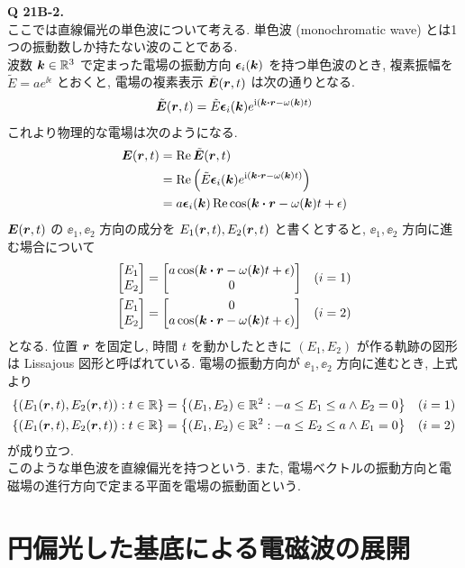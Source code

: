 \documentclass[uplatex,a4paper,dvipdfmx]{jsarticle}
\theoremstyle{definition}
\begin{document}
\textbf{Q 21B-2.} \\
ここでは直線偏光の単色波について考える. 単色波 (monochromatic wave) とは1つの振動数しか持たない波のことである. \\
波数 $\vb*{k}\in\mathbb{R}^3$ で定まった電場の振動方向 $\vb*{\epsilon}_i(\vb*{k})$ を持つ単色波のとき, 複素振幅を $\tilde{E} = ae^{\ii\epsilon}$ とおくと, 電場の複素表示 $\tilde{\vb*{E}}(\vb*{r}, t)$ は次の通りとなる.
\begin{align}
  \tilde{\EE}(\rr, t) = \tilde{E}\ee_i(\kk)e^{\ii(\kk\vdot\rr-\omega(\kk)t)}
\end{align}
これより物理的な電場は次のようになる.
\begin{align}
  \EE(\rr, t) & = \Re\tilde{\EE}(\rr, t)                                               \\
              & = \Re\left(\tilde{E}\ee_i(\kk)e^{\ii(\kk\vdot\rr-\omega(\kk)t)}\right) \\
              & = a\ee_i(\kk)\Re\cos(\kk\vdot\rr-\omega(\kk)t + \epsilon)
\end{align}
$\vb*{E}(\vb*{r}, t)$ の $\ee_1, \ee_2$ 方向の成分を $E_1(\vb*{r}, t), E_2(\vb*{r}, t)$ と書くとすると, $\ee_1, \ee_2$ 方向に進む場合について
\begin{align}
  \mqty[E_1 \\ E_2] &= \mqty[a\cos(\kk\vdot\rr - \omega(\kk)t + \epsilon) \\ 0] & (i = 1) \\
  \mqty[E_1 \\ E_2] &= \mqty[0 \\ a\cos(\kk\vdot\rr - \omega(\kk)t + \epsilon)] & (i = 2)
\end{align}
となる. 位置 $\vb*{r}$ を固定し, 時間 $t$ を動かしたときに $(E_1, E_2)$ が作る軌跡の図形は Lissajous 図形と呼ばれている. 電場の振動方向が $\ee_1, \ee_2$ 方向に進むとき, 上式より
\begin{align}
  \qty{\qty(E_1(\vb*{r}, t), E_2(\vb*{r}, t)):t\in\mathbb{R}} & = \qty{\qty(E_1,E_2)\in\mathbb{R}^2:-a\leq E_1\leq a\land E_2 = 0} & (i = 1) \\
  \qty{\qty(E_1(\vb*{r}, t), E_2(\vb*{r}, t)):t\in\mathbb{R}} & = \qty{\qty(E_1,E_2)\in\mathbb{R}^2:-a\leq E_2\leq a\land E_1 = 0} & (i = 2)
\end{align}
が成り立つ. \\
このような単色波を直線偏光を持つという. また, 電場ベクトルの振動方向と電磁場の進行方向で定まる平面を電場の振動面という.


\section{円偏光した基底による電磁波の展開}
\end{document}
